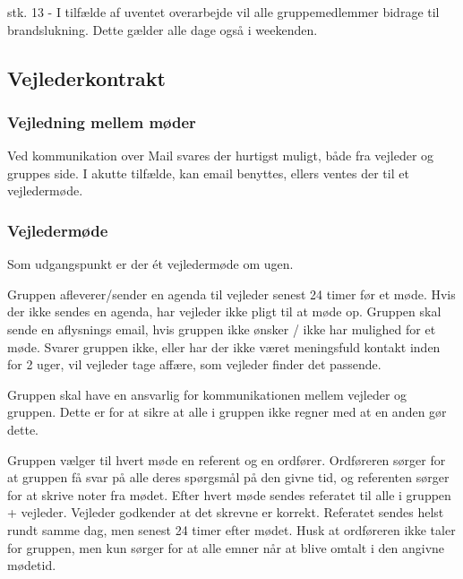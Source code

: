 \documentclass[../../main.tex]{subfiles}
\begin{document}
stk. 13 - I tilfælde af uventet overarbejde vil alle gruppemedlemmer bidrage til
brandslukning. Dette gælder alle dage også i weekenden.\\


\subsection{Vejlederkontrakt}

\subsubsection{Vejledning mellem møder}
Ved kommunikation over Mail svares der hurtigst muligt, både fra vejleder og gruppes side.
I akutte tilfælde, kan email benyttes, ellers ventes der til et vejledermøde.

\subsubsection{Vejledermøde}
Som udgangspunkt er der ét vejledermøde om ugen.

Gruppen afleverer/sender en agenda til vejleder senest 24 timer før et møde.
Hvis der ikke sendes en agenda, har vejleder ikke pligt til at møde op. Gruppen
skal sende en aflysnings email, hvis gruppen ikke ønsker / ikke har mulighed
for et møde.
Svarer gruppen ikke, eller har der ikke været meningsfuld kontakt inden
for 2 uger, vil vejleder tage affære, som vejleder finder det passende.

Gruppen skal have en ansvarlig for kommunikationen mellem vejleder og gruppen.
Dette er for at sikre at alle i gruppen ikke regner med at en anden gør dette.

Gruppen vælger til hvert møde en referent og en ordfører.
Ordføreren sørger for at gruppen få svar på alle deres spørgsmål på den
givne tid, og referenten sørger for at skrive noter fra mødet.
Efter hvert møde sendes referatet til alle i gruppen +  vejleder.
Vejleder godkender at det skrevne er korrekt. Referatet sendes helst
rundt samme dag, men senest 24 timer efter mødet. Husk at ordføreren ikke
taler for gruppen, men kun sørger for at alle emner når at blive
omtalt i den angivne mødetid.
\end{document}
